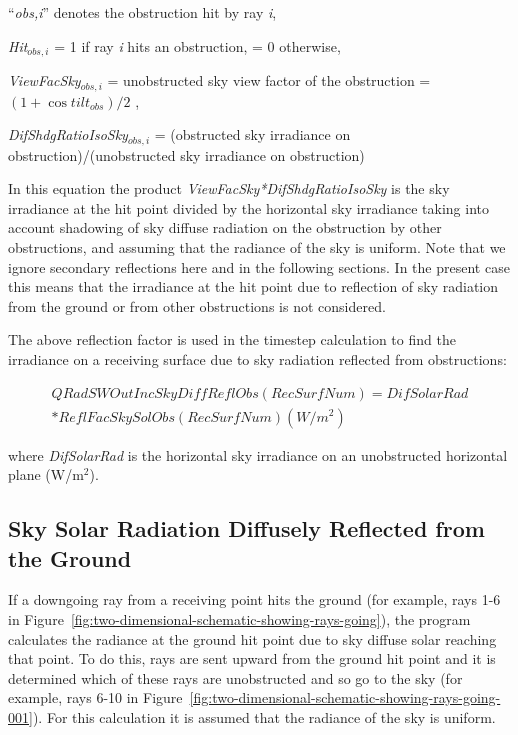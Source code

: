 ``\emph{obs,i}'' denotes the obstruction hit by ray \emph{i},

\emph{Hit\(_{obs,i}\)} = 1 if ray \emph{i} hits an obstruction, = 0 otherwise,

\emph{ViewFacSky\(_{obs,i}\)} = unobstructed sky view factor of the obstruction = \((1 + \cos til{t_{obs}})/2\) ,

\emph{DifShdgRatioIsoSky\(_{obs,i}\)} = (obstructed sky irradiance on obstruction)/(unobstructed sky irradiance on obstruction)

In this equation the product \emph{ViewFacSky*DifShdgRatioIsoSky} is the sky irradiance at the hit point divided by the horizontal sky irradiance taking into account shadowing of sky diffuse radiation on the obstruction by other obstructions, and assuming that the radiance of the sky is uniform. Note that we ignore secondary reflections here and in the following sections. In the present case this means that the irradiance at the hit point due to reflection of sky radiation from the ground or from other obstructions is not considered.

The above reflection factor is used in the timestep calculation to find the irradiance on a receiving surface due to sky radiation reflected from obstructions:

\begin{equation}
\begin{split}
QRadSWOutIncSkyDiffReflObs(RecSurfNum) = DifSolarRad \\
* ReflFacSkySolObs(RecSurfNum) (W/m^{2})
\end{split}
\end{equation}

where \emph{DifSolarRad} is the horizontal sky irradiance on an unobstructed horizontal plane (W/m\(^{2}\)).

\subsection{Sky Solar Radiation Diffusely Reflected from the Ground}\label{sky-solar-radiation-diffusely-reflected-from-the-ground}

If a downgoing ray from a receiving point hits the ground (for example, rays 1-6 in Figure~\ref{fig:two-dimensional-schematic-showing-rays-going}), the program calculates the radiance at the ground hit point due to sky diffuse solar reaching that point. To do this, rays are sent upward from the ground hit point and it is determined which of these rays are unobstructed and so go to the sky (for example, rays 6-10 in Figure~\ref{fig:two-dimensional-schematic-showing-rays-going-001}). For this calculation it is assumed that the radiance of the sky is uniform.

